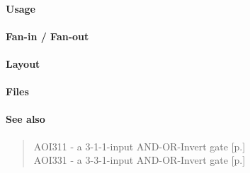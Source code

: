 \paragraph{Usage}

\paragraph{Fan-in / Fan-out}

\paragraph{Layout}

\paragraph{Files}

\paragraph{See also}
\begin{quote}
    AOI311 - a 3-1-1-input AND-OR-Invert gate [p.\pageref{AOI311}] \\
    AOI331 - a 3-3-1-input AND-OR-Invert gate [p.\pageref{AOI331}]
\end{quote}
